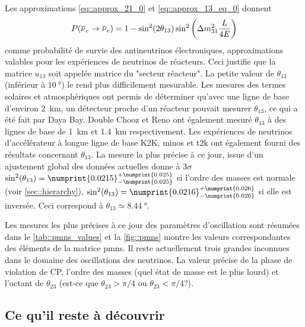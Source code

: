       Les approximations \eqref{eq::approx_21_0} et \eqref{eq::approx_13_eq_0} donnent
      \begin{equation}\label{eq::e_approx_reacteur}
        P(\overline{\nu}_e\to\overline{\nu}_e) = 1-\sin^2(2\theta_{13})\sin^2\left(\Delta m^2_{31}\frac{L}{4E}\right)
      \end{equation}
      comme probabilité de survie des antineutrinos électroniques, approximations valables pour les expériences de neutrinos de réacteurs. Ceci justifie que la matrice $u_{13}$ soit appelée matrice du "secteur réacteur". La petite valeur de $\theta_{13}$ (inférieur à $\SI{10}{\degree}$) le rend plus difficilement mesurable. Les mesures des termes solaires et atmosphériques ont permis de déterminer qu'avec une ligne de base d'environ \SI{2}{\kilo\meter}, un détecteur proche d'un réacteur pouvait mesurer $\theta_{13}$, ce qui a été fait par Daya Bay\cite{An2014}. Double Chooz\cite{Crespo-Anadon2014} et Reno\cite{Collaboration2010} ont également mesuré $\theta_{13}$ à des lignes de base de \SI{1}{\kilo\meter} et \SI{1.4}{\kilo\meter} respectivement. Les expériences de neutrinos d'accélérateur à longue ligne de base K2K\cite{Collaboration2006a}, \gls{minos}\cite{Collaboration2014} et \gls{t2k}\cite{Abe2018} ont également fourni des résultats concernant $\theta_{13}$. La mesure la plus précise à ce jour, issue d'un ajustement global des données actuelles donne à $3\sigma$ $\sin^2(\theta_{13})=\numprint{0.0215}^{+\numprint{0.025}}_{-\numprint{0.025}}$\cite{pdg2018} si l'ordre des masses est normale (voir \autoref{sec::hierarchy}), $\sin^2(\theta_{13})=\numprint{0.0216}^{+\numprint{0.026}}_{-\numprint{0.026}}$ si elle est inversée. Ceci correspond à $\theta_{13}\simeq\SI{8.44}{\degree}$.

    Les mesures les plus précises à ce jour des paramètres d'oscillation sont résumées dans le \autoref{tab::pmns_values} et la \autoref{fig::pmns} montre les valeurs correspondantes des éléments de la matrice \gls{pmns}.
    Il reste actuellement trois grandes inconnues dans le domaine des oscillations des neutrinos. La valeur précise de la phase de violation de CP, l'ordre des masses (quel état de masse est le plus lourd) et l'octant de $\theta_{23}$ (est-ce que $\theta_{23}>\pi/4$ ou $\theta_{23}<\pi/4$?).

    \subsection{Ce qu'il reste à découvrir}\label{sec::a_decouvrir}

